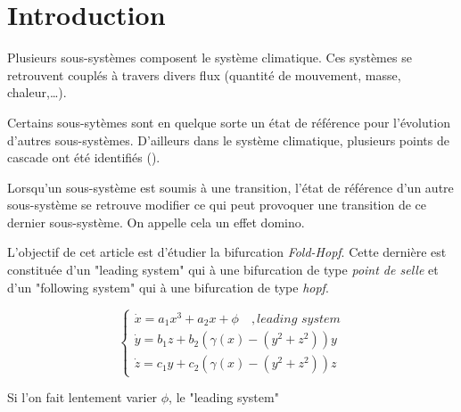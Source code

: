 \section{Introduction}

Plusieurs sous-systèmes composent le système climatique. Ces systèmes se retrouvent couplés à travers divers flux (quantité de mouvement, masse, chaleur,\dots).

Certains sous-sytèmes sont en quelque sorte un état de référence pour l'évolution d'autres sous-systèmes. D'ailleurs dans le système climatique, plusieurs points de cascade ont été identifiés (\cite{Lenton_Held_Kriegler_Hall_Lucht_Rahmstorf_Schellnhuber_2008}). 

Lorsqu'un sous-système est soumis à une transition, l'état de référence d'un autre sous-système se retrouve modifier ce qui peut provoquer une transition de ce dernier sous-système. On appelle cela un effet domino.


L'objectif de cet article est d'étudier la bifurcation \emph{Fold-Hopf}. Cette dernière est constituée d'un "leading system" qui à une bifurcation de type \emph{point de selle} et d'un "following system" qui à une bifurcation de type \emph{hopf}.

\begin{equation}
  \begin{cases}
    \dot{x} = a_1x^3 + a_2x + \phi \quad, \textit{leading system} \\
    \dot{y} = b_1z + b_2(\gamma(x) - (y^2 + z^2))y \\
    \dot{z} = c_1y + c_2(\gamma(x) - (y^2 + z^2))z
  \end{cases}
\end{equation}

Si l'on fait lentement varier $\phi$, le "leading system"  